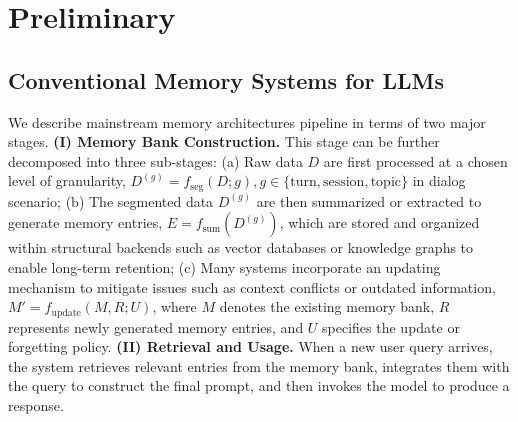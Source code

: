 \section{Preliminary}

\subsection{Conventional Memory Systems for LLMs}
\label{main_text_preliminary}
We describe mainstream memory architectures pipeline in terms of two major stages. 
\textbf{(I) Memory Bank Construction.} This stage can be further decomposed into three sub-stages:  
(a) Raw data $D$ are first processed at a chosen level of granularity, $D^{(g)} = f_{\text{seg}}(D; g), g \in \{\text{turn}, \text{session}, \text{topic}\}$ in dialog scenario;  
(b) The segmented data $D^{(g)}$ are then summarized or extracted to generate memory entries, $E = f_{\text{sum}}(D^{(g)})$, which are stored and organized within structural backends such as vector databases or knowledge graphs to enable long-term retention;  
(c) Many systems incorporate an updating mechanism to mitigate issues such as context conflicts or outdated information, $M' = f_{\text{update}}(M, R; U)$, where $M$ denotes the existing memory bank, $R$ represents newly generated memory entries, and $U$ specifies the update or forgetting policy.  
\textbf{(II) Retrieval and Usage.} When a new user query arrives, the system retrieves relevant entries from the memory bank, integrates them with the query to construct the final prompt, and then invokes the model to produce a response.


